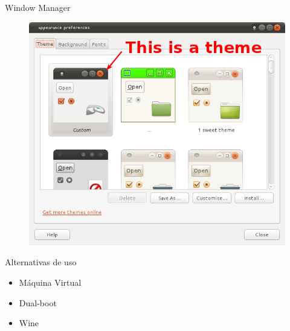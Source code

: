 \documentclass[size=14pt,
style=paintings
]{powerdot}
\newenvironment{vslide}{\vspace{\stretch{1}}}{\vspace{\stretch{1}}}
\begin{document}
\begin{slide}{Window Manager}
  \centering
	\begin{figure}[!h]
		\includegraphics[scale=0.28]{imagens/slide/windowManagerTheme}
	\end{figure}
\end{slide}

\begin{slide}{Alternativas de uso}
\begin{vslide}

\begin{itemize}
\item Máquina Virtual
\item Dual-boot
\item Wine
\end{itemize}

\end{vslide}
\end{slide}
\end{document}
